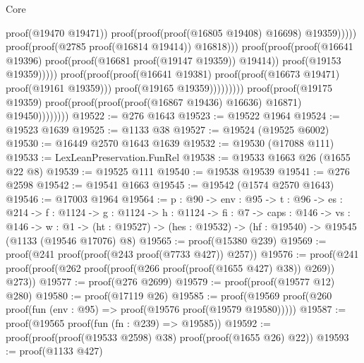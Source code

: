 \begin{lexlean}{Core}
\begin{coremodule}
                                                                            proof(@19470 @19471))
                                                                          proof(proof(proof(@16805
                                                                                  @19408)
                                                                                @16698)
                                                                              @19359)))))
                                                            proof(proof(@2785 proof(@16814 @19414))
                                                                @16818)))
                                                      proof(proof(proof(@16641 @19396)
                                                            proof(proof(@16681 proof(@19147 @19359))
                                                                @19414))
                                                          proof(@19153 @19359)))))
                                            proof(proof(proof(@16641 @19381)
                                                  proof(proof(@16673 @19471) proof(@19161 @19359)))
                                                proof(@19165 @19359)))))))))
                  proof(proof(@19175 @19359)
                      proof(proof(proof(proof(@16867 @19436) @16636) @16871) @19450))))))))
@19522 := @276 @1643
@19523 := @19522 @1964
@19524 := @19523 @1639
@19525 := @1133 @38
@19527 := @19524 (@19525 @6002)
@19530 := @16449 @2570 @1643 @1639
@19532 := @19530 (@17088 @111)
@19533 := LexLeanPreservation.FunRel
@19538 := @19533 @1663 @26 (@1655 @22 @8)
@19539 := @19525 @111
@19540 := @19538 @19539
@19541 := @276 @2598
@19542 := @19541 @1663
@19545 := @19542 (@1574 @2570 @1643)
@19546 := @17003 @1964
@19564 := {p : @90} ->
  {env : @95} ->
  {t : @96} ->
  {es : @214} ->
  {f : @1124} ->
  {g : @1124} ->
  {h : @1124} ->
  {fi : @7} ->
  {caps : @146} ->
  {vs : @146} ->
  {w : @1} -> (ht : @19527) -> (hes : @19532) -> (hf : @19540) -> @19545 (@1133 (@19546 @17076) @8)
@19565 := proof(@15380 @239)
@19569 := proof(@241 proof(proof(@243 proof(@7733 @427)) @257))
@19576 := proof(@241 proof(proof(@262 proof(proof(@266 proof(proof(@1655 @427) @38)) @269)) @273))
@19577 := proof(@276 @2699)
@19579 := proof(proof(@19577 @12) @280)
@19580 := proof(@17119 @26)
@19585 := proof(@19569 proof(@260 proof(fun (env : @95) => proof(@19576 proof(@19579 @19580)))))
@19587 := proof(@19565 proof(fun (fn : @239) => @19585))
@19592 := proof(proof(proof(@19533 @2598) @38) proof(proof(@1655 @26) @22))
@19593 := proof(@1133 @427)

\end{coremodule}
\end{lexlean}
